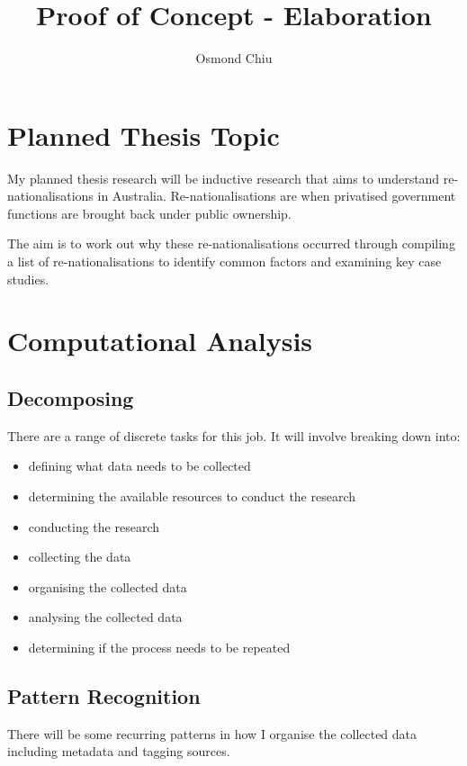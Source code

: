 \documentclass{article}
\title{Proof of Concept - Elaboration}
\author{Osmond Chiu}
\begin{document}
\maketitle
\section*{Planned Thesis Topic}

My planned thesis research will be inductive research that aims to understand re-nationalisations in Australia. Re-nationalisations are when privatised government functions are brought back under public ownership.\par
The aim is to work out why these re-nationalisations occurred through compiling a list of re-nationalisations to identify common factors and examining key case studies.

\section*{Computational Analysis}
\subsection*{Decomposing}
There are a range of discrete tasks for this job. It will involve breaking down into:
\begin{itemize}
    \item defining what data needs to be collected
    \item determining the available resources to conduct the research
    \item conducting the research
    \item collecting the data
    \item organising the collected data
    \item analysing the collected data
    \item determining if the process needs to be repeated
\end{itemize}

\subsection*{Pattern Recognition}
There will be some recurring patterns in how I organise the collected data including metadata and tagging sources.\par
\end{document}
